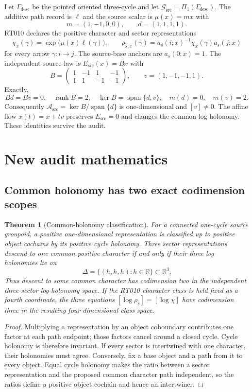 \documentclass[11pt]{article}
\newtheorem{theorem}{Theorem}
\newcommand{\R}{\mathbb{R}}
\newcommand{\Gsrc}{\mathcal{G}_{\mathrm{src}}}
\newcommand{\Asrc}{\mathcal{A}_{\mathrm{src}}}
\begin{document}
Let $\Gamma_{\mathrm{desc}}$ be the pointed oriented three-cycle and let
$\Gsrc=\Pi_1(\Gamma_{\mathrm{desc}})$.  The additive path record is $\ell$ and
the source scalar is $\mu(x)=m x$ with
\[
m=(1,-1,0,0),\qquad d=(1,1,1,1).
\]
RT010 declares the positive character and sector representations
\[
 \chi_x(\gamma)=\exp\!\bigl(\mu(x)\ell(\gamma)\bigr),\qquad
 \rho_{s,x}(\gamma)=a_s(i;x)^{-1}\chi_x(\gamma)a_s(j;x)
\]
for every arrow $\gamma:i\to j$.  The source-base anchors are
$a_s(0;x)=1$.  The independent source law is $E_{\mathrm{src}}(x)=Bx$ with
\[
B=\begin{pmatrix}1&-1&1&-1\\1&1&-1&-1\end{pmatrix},\qquad
v=(1,-1,-1,1).
\]
Exactly,
\[
 Bd=Bv=0,\quad \operatorname{rank}B=2,\quad
 \ker B=\operatorname{span}\{d,v\},\quad m(d)=0,\quad m(v)=2.
\]
Consequently $\Asrc=\ker B/\operatorname{span}\{d\}$ is one-dimensional and
$[v]\ne0$.  The affine flow $x(t)=x+tv$ preserves $E_{\mathrm{src}}=0$ and
changes the common log holonomy.  These identities survive the audit.

\section{New audit mathematics}

\subsection{Common holonomy has two exact codimension scopes}

\begin{theorem}[Common-holonomy classification]
For a connected one-cycle source groupoid, a positive one-dimensional
representation is classified up to positive object cochains by its positive
cycle holonomy.  Three sector representations descend to one common positive
character if and only if their three log holonomies lie on
\[
 \Delta=\{(h,h,h):h\in\R\}\subset\R^3.
\]
Thus descent to some common character has codimension two in the independent
three-sector log-holonomy space.  If the RT010 character class is held fixed as
a fourth coordinate, the three equations
$[\log\rho_s]=[\log\chi]$ have codimension three in the resulting
four-dimensional class space.
\end{theorem}

\begin{proof}
Multiplying a representation by an object coboundary contributes one factor at
each path endpoint; those factors cancel around a closed cycle.  Cycle
holonomy is therefore invariant.  If every sector is intertwined with one
character, their holonomies must agree.  Conversely, fix a base object and a
path from it to every object.  Equal cycle holonomy makes the ratio between a
sector representation and the proposed common character path independent, so
the ratios define a positive object cochain and hence an intertwiner.
\end{proof}
\end{document}
